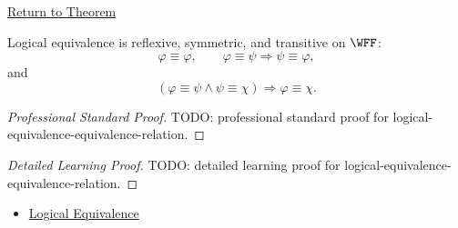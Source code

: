 \newpage
{}
\label{prf:logical-equivalence-equivalence-relation}

\begin{remark*}[Return]
\hyperref[thm:logical-equivalence-equivalence-relation]{Return to Theorem}
\end{remark*}

\begin{theorem*}
Logical equivalence is reflexive, symmetric, and transitive on \(\WFF\):
\[
\varphi\equiv\varphi,
\qquad
\varphi\equiv\psi\Longrightarrow\psi\equiv\varphi,
\]
and
\[
(\varphi\equiv\psi\land\psi\equiv\chi)
\Longrightarrow
\varphi\equiv\chi.
\]
\end{theorem*}

\begin{proof}[Professional Standard Proof]
\LRAProofBodyStart
TODO: professional standard proof for logical-equivalence-equivalence-relation.
\end{proof}

\begin{proof}[Detailed Learning Proof]
\LRAProofBodyStart
TODO: detailed learning proof for logical-equivalence-equivalence-relation.
\end{proof}

\begin{remark*}
\end{remark*}

\begin{dependencies}
\begin{itemize}
  \item \hyperref[def:logical-equivalence-propositional-logic]{Logical Equivalence}
\end{itemize}
\end{dependencies}

\clearpage

